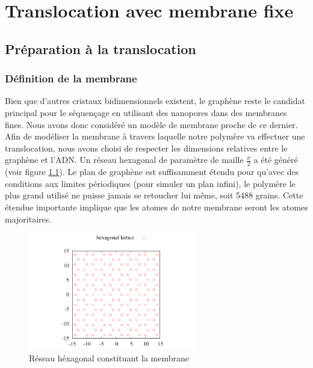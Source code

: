 
\chapter{Translocation avec membrane fixe}
\label{translocmurfixe}

\minitoc

\newpage








\section{Préparation à la translocation}

\subsection{Définition de la membrane}

Bien que d'autres cristaux bidimensionnels existent, le graphène reste le candidat principal pour le séquençage en utilisant des nanopores dans des membranes fines. Nous avons donc considéré un modèle de membrane proche de ce dernier.
Afin de modéliser la membrane à travers laquelle notre polymère va effectuer une translocation, nous avons choisi de respecter les dimensions relatives  entre le graphène et l'ADN. Un réseau hexagonal de paramètre de maille $\frac{\sigma}{2}$ a été généré (voir figure \ref{reseau}). Le plan de graphène est suffisamment étendu pour qu'avec des conditions aux limites périodiques (pour simuler un plan infini), le polymère le plus grand utilisé ne puisse jamais se retoucher lui même, soit 5488 grains. Cette étendue importante implique que les atomes de notre membrane seront les atomes majoritaires.

\begin{figure}[H]
\begin{center}
\includegraphics[width=0.65\textwidth]{lattice.pdf} 

\caption{Réseau héxagonal constituant la membrane}
\label{reseau}
\end{center}
\end{figure}

